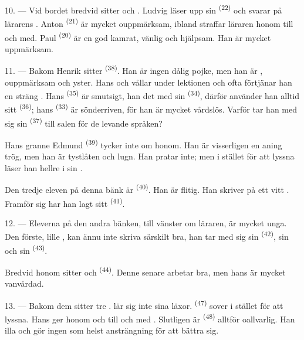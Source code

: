 10. --- Vid bordet bredvid sitter  och . Ludvig läser upp
sin  \textsuperscript{(22)} och svarar på lärarens
. Anton \textsuperscript{(21)} är mycket ouppmärksam, ibland
straffar läraren honom till och med. Paul \textsuperscript{(20)} är en god kamrat, vänlig och
hjälpsam. Han är mycket uppmärksam.

\VUsaut{4.2mm}
\VUsaut{3.2mm}

11. --- Bakom Henrik sitter  \textsuperscript{(38)}. Han är ingen dålig pojke,
men han är , ouppmärksam och yster. Hans
 och  vållar  under
lektionen och ofta förtjänar han en sträng . Hans
 \textsuperscript{(35)} är smutsigt, han  det
 med sin  \textsuperscript{(34)}, därför
använder han alltid sitt  \textsuperscript{(36)}; hans
 \textsuperscript{(33)} är sönderriven, för han är mycket
vårdslös. Varför tar han med sig sin  \textsuperscript{(37)} till salen
för de levande språken?

Hans granne Edmund \textsuperscript{(39)} tycker inte om honom. Han är visserligen en aning
trög, men han är tystlåten och lugn. Han pratar inte; men i stället för att lyssna läser han
hellre  i sin .

Den tredje eleven på denna bänk är  \textsuperscript{(40)}. Han är flitig. Han
skriver på ett vitt . Framför sig har han lagt sitt 
\textsuperscript{(41)}.

12. --- Eleverna på den andra bänken, till vänster om läraren, är mycket unga. Den förste,
lille , kan ännu inte skriva särskilt bra, han tar med sig sin
 \textsuperscript{(42)}, sin  och sin 
\textsuperscript{(43)}.

Bredvid honom sitter  och  \textsuperscript{(44)}. Denne
senare arbetar bra, men hans  är mycket vanvårdad.

13. --- Bakom dem sitter tre .  lär sig inte sina läxor.
 \textsuperscript{(47)} sover i stället för att lyssna. Hans  ger
honom  och till och med
. Slutligen är  \textsuperscript{(48)} alltför
oallvarlig. Han  illa och gör ingen som helst ansträngning för att bättra
sig.

